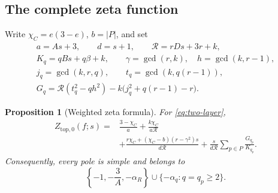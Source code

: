 \documentclass[11pt]{article}
\numberwithin{equation}{section}
\newtheorem{proposition}[theorem]{Proposition}
\theoremstyle{definition}
\theoremstyle{remark}
\begin{document}
\subsection{The complete zeta function}

Write $\chi_C=e(3-e)$, $b=|P|$, and set
\begin{equation}\label{eq:zeta-denominators}
 \begin{gathered}
 a=As+3,\qquad d=s+1,\qquad \mathcal R=rDs+3r+k,\\
 K_q=qBs+q\beta+k,\qquad
 \gamma=\gcd(r,k),\quad h=\gcd(k,r-1),\\
 j_q=\gcd(k,r,q),\qquad t_q=\gcd(k,q(r-1)),\\
 G_q=\mathcal R(t_q^2-qh^2)
               -k\bigl(j_q^2+q(r-1)-r\bigr).
 \end{gathered}
\end{equation}

\begin{proposition}[Weighted zeta formula]\label{prop:zeta}
For \eqref{eq:two-layer},
\begin{equation}\label{eq:global-zeta}
 \begin{split}
 Z_{\mathrm{top},0}(f;s)
   ={}&\frac{3-\chi_C}{a}+\frac{k\chi_C}{a\mathcal R}\\
     &+\frac{r\chi_C+(\chi_C-b)(r-\gamma^2)s}
                  {d\mathcal R}
       +\frac{s}{d\mathcal R}
                   \sum_{p\in P}\frac{G_{q_p}}{K_{q_p}}.
 \end{split}
\end{equation}
Consequently, every pole is simple and belongs to
\begin{equation}\label{eq:pole-list}
 \left\{-1,-\frac3A,-\alpha_R\right\}
        \cup\{-\alpha_q:q=q_p\ge2\}.
\end{equation}
\end{proposition}
\end{document}
